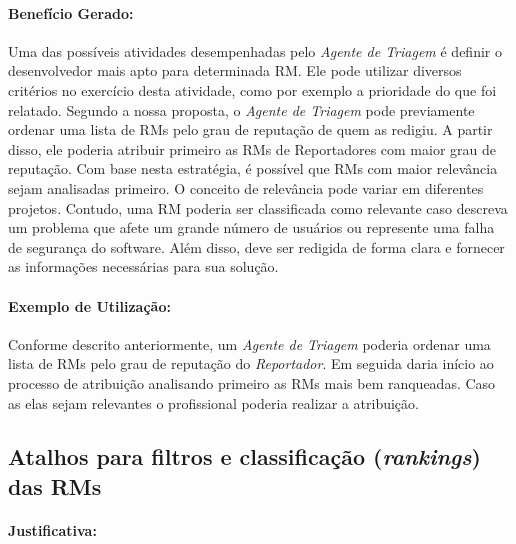 \paragraph{Benefício Gerado:}\label{par:papéis_afetados_s03}

Uma das possíveis atividades desempenhadas pelo \textit{Agente de Triagem} é
definir o desenvolvedor mais apto para determinada RM\@. Ele pode utilizar
diversos critérios no exercício desta atividade, como por exemplo a prioridade
do que foi relatado. Segundo a nossa proposta, o \textit{Agente de Triagem} pode
previamente ordenar uma lista de RMs pelo grau de reputação de quem as redigiu.
A partir disso, ele poderia atribuir primeiro as RMs de Reportadores com maior
grau de reputação. Com base nesta estratégia, é possível que RMs com maior
relevância sejam analisadas primeiro. O conceito de relevância pode variar em
diferentes projetos. Contudo, uma RM poderia ser classificada como relevante
caso descreva um problema que afete um grande número de usuários ou represente
uma falha de segurança do software. Além disso, deve ser redigida de forma clara
e fornecer as informações necessárias para sua solução.

\paragraph{Exemplo de Utilização:}\label{par:exemplo_de_utilização_s03}

Conforme descrito anteriormente, um \textit{Agente de Triagem} poderia ordenar
uma lista de RMs pelo grau de reputação do \textit{Reportador}. Em seguida daria
início ao processo de atribuição analisando primeiro as RMs mais bem ranqueadas.
Caso as elas sejam relevantes o profissional poderia realizar a atribuição.

\subsection{Atalhos para filtros e classificação (\textit{rankings}) das RMs}\label{sub:histórico_das_ùltimas_rm_s}


\paragraph{Justificativa:}\label{par:justificativa_s04}

